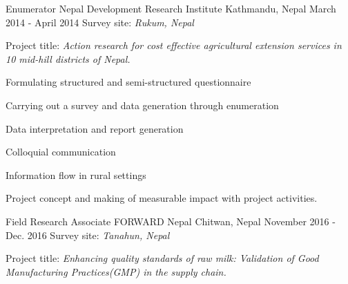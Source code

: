 \begin{cventries}
  \cventry
    {Enumerator}
    {Nepal Development Research Institute}
    {Kathmandu, Nepal}
    {March 2014 - April 2014}
    {Survey site: \it {Rukum, Nepal}}
    \newcommand\textbox[1]{%
  \parbox{.80\textwidth}{#1}%
}
	\noindent\textbox{Project title: \emph{Action research for cost effective agricultural extension services in 10 mid-hill districts of Nepal.} 
    \\}
    {}
    {
    \begin{cvitems}
        \item {Formulating structured and semi-structured questionnaire}
        \item {Carrying out a survey and data generation through enumeration}
		\item {Data interpretation and report generation}
        \item {Colloquial communication}
        \item {Information flow in rural settings}
        \item {Project concept and making of measurable impact with project activities.} \\
        
      \end{cvitems}
    }
  
  \cventry
    {Field Research Associate}
    {FORWARD Nepal}
    {Chitwan, Nepal}
    {November 2016 - Dec. 2016}
    {Survey site: \it {Tanahun, Nepal}}
    \noindent\textbox{Project title: \emph{Enhancing quality standards of raw milk: Validation of Good Manufacturing Practices(GMP) in the supply chain.}\hfill
    } \\
    
    {
      \begin{cvitems}
        
      \end{cvitems}
    }
\end{cventries}
